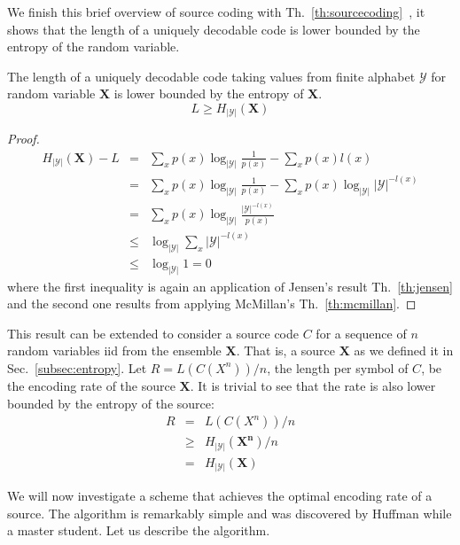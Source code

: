 We finish this brief overview of source coding with Th.~\ref{th:sourcecoding}~\cite{Cover_91}, it shows that the length  of a uniquely decodable code is lower bounded by the entropy of the random variable.
\begin{theorem}
\label{th:sourcecoding}
The length of a uniquely decodable code taking values from finite alphabet $\mathcal{Y}$ for random variable $\mathbf{X}$ is lower bounded by the entropy of $\mathbf{X}$.
\begin{equation*}
L\geq H_{|\mathcal{Y}|}(\mathbf{X})
\end{equation*}
\end{theorem}
\begin{proof}
\begin{eqnarray}
H_{|\mathcal{Y}|}(\mathbf{X}) - L &=& \sum_{x} p(x) \log_{|\mathcal{Y}|} \frac{1}{p(x)} - \sum_{x}p(x)l(x) \nonumber \\
                                      &=& \sum_{x} p(x) \log_{|\mathcal{Y}|} \frac{1}{p(x)} - \sum_{x} p(x)  \log_{|\mathcal{Y}|} |\mathcal{Y}|^{-l(x)} \nonumber \\
                                      &=& \sum_{x} p(x) \log_{|\mathcal{Y}|} \frac{|\mathcal{Y}|^{-l(x)} }{p(x)} \nonumber \\
                                      &\leq & \log_{|\mathcal{Y}|} \sum_{x} |\mathcal{Y}|^{-l(x)} \nonumber \\
                                      &\leq & \log_{|\mathcal{Y}|} 1 = 0
\end{eqnarray}
\noindent where the first inequality is again an application of Jensen's result Th.~\ref{th:jensen} and the second one results from applying McMillan's Th.~\ref{th:mcmillan}.
\end{proof}
This result can be extended to consider a source code $C$ for a sequence of $n$ random variables {iid} from the ensemble $\mathbf{X}$. That is, a source  $\mathbf{X}$ as we defined it in Sec.~\ref{subsec:entropy}. Let $R=L(C({X^n}))/n$, the length per symbol of $C$, be the encoding rate of the source $\mathbf{X}$. It is trivial to see that the rate is also lower bounded by the entropy of the source: \begin{eqnarray} R &=& L(C({X^n}))/n \nonumber\\
  &\geq& H_{|\mathcal{Y}|}(\mathbf{X^n})/n \nonumber\\
 &=& H_{|\mathcal{Y}|}(\mathbf{X})
\end{eqnarray}

We will now investigate a scheme that achieves the optimal encoding rate of a source. The algorithm is remarkably simple and was discovered by Huffman \cite{} while a master student. Let us describe the algorithm.

